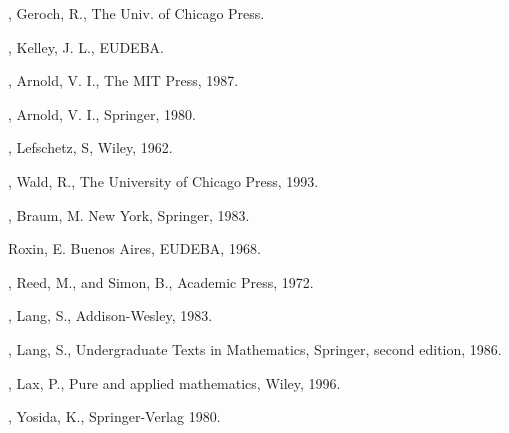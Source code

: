 \begin{thebibliography}{99}

,
                  Geroch, R.,
                  The Univ. of Chicago Press.

,
                 Kelley, J. L.,
                 EUDEBA.

, 
                 Arnold, V. I., 
                 The MIT Press,
                 1987.

,
		    Arnold, V. I., 
		    Springer,
	            1980.

,
                 Lefschetz, S,
                 Wiley, 
                 1962.

,
                 Wald, R.,
                 The University of Chicago Press,
                 1993.

,
                 Braum, M.
                 New York, Springer, 
                 1983.

                 Roxin, E.
                 Buenos Aires, EUDEBA,
                 1968.


,
               Reed, M., and Simon, B.,
               Academic Press,
               1972.

,
                 Lang, S.,
                 Addison-Wesley,
                 1983.

,
		 Lang, S., Undergraduate Texts in Mathematics,
	         Springer, second edition, 1986.

, 
		Lax, P., Pure and applied mathematics, 
		Wiley, 1996.

,
                   Yosida, K.,
                   Springer-Verlag
                   1980.


\end{thebibliography}
